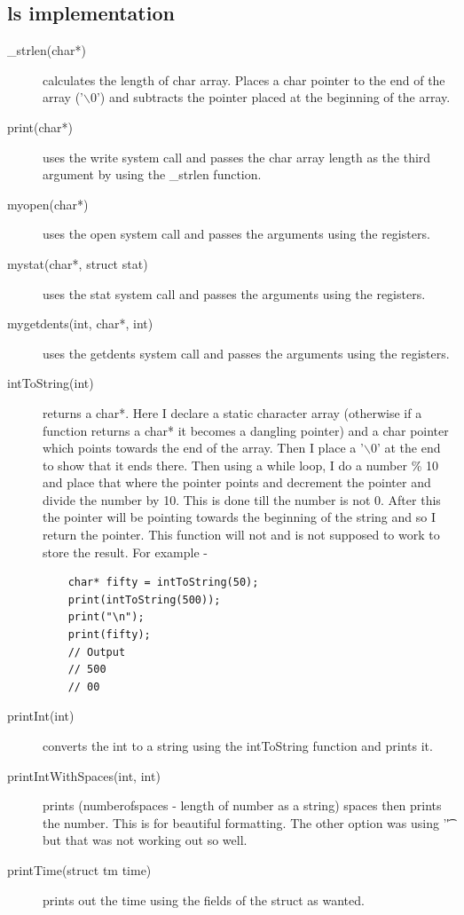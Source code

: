 \documentclass[11pt]{article}
\begin{document}
\subsection{ls implementation}
\label{sec:org5f5936a}
\begin{description}
\item[{\_strlen(char*)}] calculates the length of char array. Places a char pointer to the end of the array ('$\backslash$0') and subtracts the pointer placed at the beginning of the array.
\item[{print(char*)}] uses the write system call and passes the char array length as the third argument by using the \_strlen function.
\item[{myopen(char*)}] uses the open system call and passes the arguments using the registers.
\item[{mystat(char*, struct stat)}] uses the stat system call and passes the arguments using the registers.
\item[{mygetdents(int, char*, int)}] uses the getdents system call and passes the arguments using the registers.
\item[{intToString(int)}] returns a char*. Here I declare a static character array (otherwise if a function returns a char* it becomes a dangling pointer) and a char pointer which points towards the end of the array. Then I place a '$\backslash$0' at the end to show that it ends there. Then using a while loop, I do a number \% 10 and place that where the pointer points and decrement the pointer and divide the number by 10. This is done till the number is not 0. After this the pointer will be pointing towards the beginning of the string and so I return the pointer. This function will not and is not supposed to work to store the result. For example -
\begin{verbatim}
    char* fifty = intToString(50);
    print(intToString(500));
    print("\n");
    print(fifty);
    // Output
    // 500
    // 00
\end{verbatim}
\item[{printInt(int)}] converts the int to a string using the intToString function and prints it.
\item[{printIntWithSpaces(int, int)}] prints (numberofspaces - length of number as a string) spaces then prints the number. This is for beautiful formatting. The other option was using '\t' but that was not working out so well.
\item[{printTime(struct tm time)}] prints out the time using the fields of the struct as wanted.

\end{description}
\end{document}

